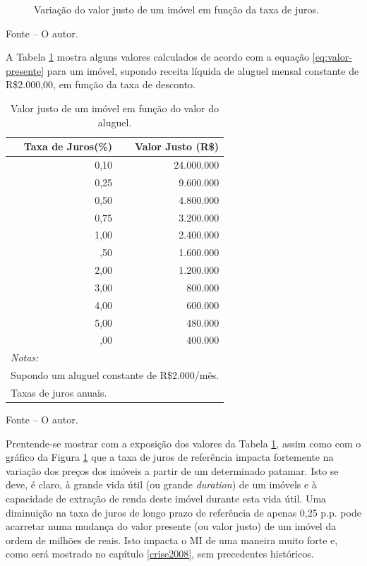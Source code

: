 \documentclass[
	12pt,				%
	oneside,			%
	a4paper,			%
	chapter=TITLE,		%
	section=TITLE,		%
	english,			%
	brazil				%
	]{abntex2}
\newcommand{\bcenter}{\begin{center}}
\newcommand{\ecenter}{\end{center}}
\begin{document}
\begin{refsection}
\begin{figure}[H]
{}

\caption{Variação do valor justo de um imóvel em função da taxa de juros.}\label{fig:valores-juros}
\end{figure}
\bcenter

\small Fonte -- O autor.
\ecenter

A Tabela \ref{tab:tabela-valor-justo} mostra alguns valores calculados de
acordo com a equação \eqref{eq:valor-presente} para um imóvel, supondo receita
líquida de aluguel mensal constante de R\$2.000,00, em função da taxa de
desconto.
\begin{table}[H]

\caption{\label{tab:tabela-valor-justo}Valor justo de um imóvel em função do valor do aluguel.}
\centering
\begin{tabular}[t]{rr}
\toprule
Taxa de Juros(\%) & Valor Justo (R\$)\\
\midrule
0,10 & 24.000.000\\
0,25 & 9.600.000\\
0,50 & 4.800.000\\
0,75 & 3.200.000\\
1,00 & 2.400.000\\
\addlinespace
1,50 & 1.600.000\\
2,00 & 1.200.000\\
3,00 & 800.000\\
4,00 & 600.000\\
5,00 & 480.000\\
\addlinespace
6,00 & 400.000\\
\bottomrule
\multicolumn{2}{l}{\rule{0pt}{1em}\textit{Notas:}}\\
\multicolumn{2}{l}{\rule{0pt}{1em}Supondo um aluguel constante de R\$2.000/mês.}\\
\multicolumn{2}{l}{\rule{0pt}{1em}Taxas de juros anuais.}\\
\end{tabular}
\end{table}
\bcenter

\small Fonte -- O autor.
\ecenter

Prentende-se mostrar com a exposição dos valores da Tabela
\ref{tab:tabela-valor-justo}, assim como com o gráfico da Figura
\ref{fig:valores-juros} que a taxa de juros de referência impacta fortemente
na variação dos preços dos imóveis a partir de um determinado patamar. Isto se
deve, é claro, à grande vida útil (ou grande \emph{duration}) de um imóvels e à
capacidade de extração de renda deste imóvel durante esta vida útil. Uma
diminuição na taxa de juros de longo prazo de referência de apenas 0,25 p.p.
pode acarretar numa mudança do valor presente (ou valor justo) de um imóvel da
ordem de milhões de reais. Isto impacta o \gls{MI} de uma maneira muito forte e,
como será mostrado no capítulo \ref{crise2008}, sem precedentes históricos.


\end{refsection}
\end{document}
